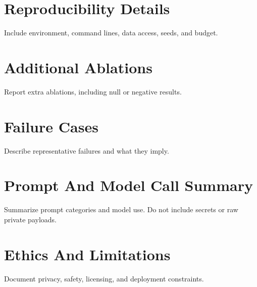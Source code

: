 \section{Reproducibility Details}

Include environment, command lines, data access, seeds, and budget.

\section{Additional Ablations}

Report extra ablations, including null or negative results.

\section{Failure Cases}

Describe representative failures and what they imply.

\section{Prompt And Model Call Summary}

Summarize prompt categories and model use. Do not include secrets or raw private payloads.

\section{Ethics And Limitations}

Document privacy, safety, licensing, and deployment constraints.
